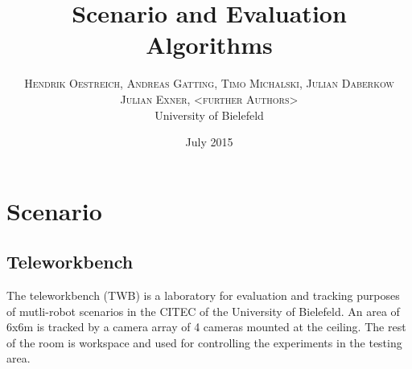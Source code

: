 \documentclass[twoside]{article}
\title{\vspace{-15mm}\fontsize{24pt}{10pt}\selectfont\textbf{Scenario and Evaluation Algorithms}} %
\author{
\large
\textsc{Hendrik Oestreich, Andreas Gatting, Timo Michalski, Julian Daberkow}\\
\textsc{Julian Exner, <further Authors>}\\%
\normalsize University of Bielefeld \\ %
}
\date{July 2015}
\begin{document}
\maketitle %

\thispagestyle{fancy} %




\section{Scenario}
\subsection{Teleworkbench}
The teleworkbench (TWB) is a laboratory for evaluation and tracking purposes of mutli-robot scenarios in the CITEC of the University of Bielefeld. An area of 6x6m is tracked by a camera array of 4 cameras mounted at the ceiling. The rest of the room is workspace and used for controlling the experiments in the testing area. 
\end{document}
